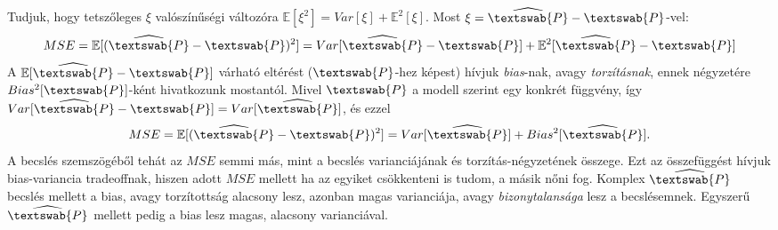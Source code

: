 \documentclass[14p]{report}
\begin{document}
	\\
	\\
	Tudjuk, hogy tetszőleges $\xi$ valószínűségi változóra $\mathbb{E}[\xi^2] = Var[\xi] + \mathbb{E}^2[\xi]$. Most $\xi = \widehat{\textswab{P}} - \textswab{P}$-vel:
	\[
		MSE = \mathbb{E}[(\widehat{\textswab{P}} - \textswab{P})^2] = Var[\widehat{\textswab{P}} - \textswab{P}] + \mathbb{E}^2[\widehat{\textswab{P}} - \textswab{P}]
	\]
	A $\mathbb{E}[\widehat{\textswab{P}} - \textswab{P}]$ várható eltérést ($\textswab{P}$-hez képest) hívjuk \emph{bias}-nak, avagy \emph{torzításnak}, ennek négyzetére $Bias^2[\textswab{P}]$-ként hivatkozunk mostantól. Mivel $\textswab{P}$ a modell szerint egy konkrét függvény, így $Var[\widehat{\textswab{P}} - \textswab{P}] = Var[\widehat{\textswab{P}}]$, és ezzel
	\[
		MSE = \mathbb{E}[(\widehat{\textswab{P}} - \textswab{P})^2] = Var[\widehat{\textswab{P}}] + Bias^2[\widehat{\textswab{P}}].
	\]
	A becslés szemszögéből tehát az $MSE$ semmi más, mint a becslés varianciájának és torzítás-négyzetének összege. Ezt az összefüggést hívjuk bias-variancia tradeoffnak, hiszen adott $MSE$ mellett ha az egyiket csökkenteni is tudom, a másik nőni fog. Komplex $\widehat{\textswab{P}}$ becslés mellett a bias, avagy torzítottság alacsony lesz, azonban magas varianciája, avagy \emph{bizonytalansága} lesz a becslésemnek. Egyszerű $\widehat{\textswab{P}}$ mellett pedig a bias lesz magas, alacsony varianciával.
	
\end{document}

